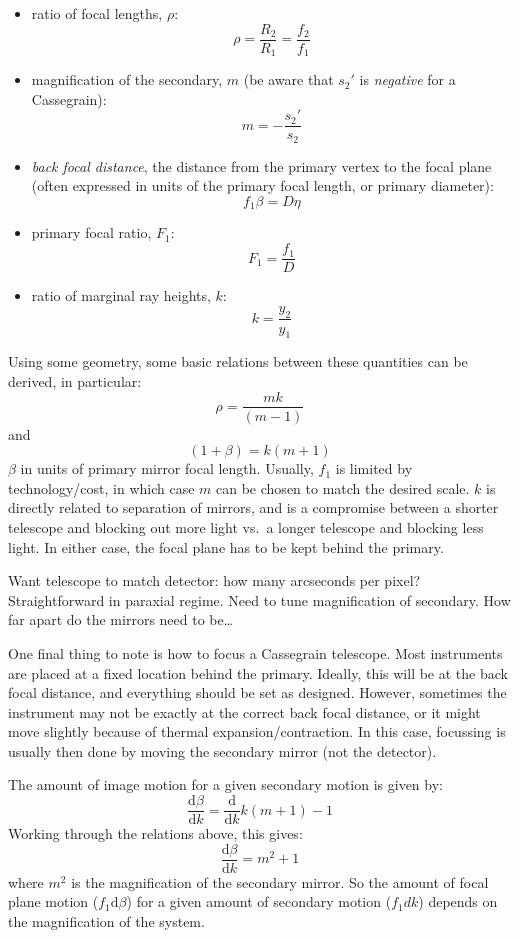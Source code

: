 \documentclass[12pt]{article}
\begin{document}
\begin{itemize}
    \item ratio of focal lengths, $\rho$:
        $$ \rho = \frac{R_2}{R_1} = \frac{f_2}{f_1}  $$
    \item magnification of the secondary, $m$ (be aware that $s_{2}'$ is
        \emph{negative} for a Cassegrain):
        $$ m = -\frac{s_2'}{s_2} $$
    \item \emph{back focal distance},
        the distance from the primary vertex to
        the focal plane (often expressed in units of the primary focal
        length, or primary diameter):
        $$ f_{1}\beta = D\eta  $$
    \item primary focal ratio, $F_{1}$:
        $$ F_{1} = \frac{f_{1}}{D} $$
    \item ratio of marginal ray heights, $k$:
        $$ k = \frac{y_{2}}{y_{1}}  $$
\end{itemize}
Using some geometry, some basic relations between these quantities
can be derived, in particular:{$$
    \rho = \frac{mk}{(m-1)}
$$}and{$$
    (1+\beta) = k(m+1)
$$}$\beta$ in units of primary mirror focal length.
Usually, $f_{1}$ is limited by technology/cost, in which case
$m$ can be chosen to match the
desired scale. $k$ is directly related to separation of mirrors, and is a
compromise between a shorter telescope and blocking out more
light vs.\ a longer telescope and blocking less light.
In either case, the focal plane has to be kept behind the primary.

\textcolor{myBlue}{%
Want telescope to match detector: how many arcseconds per pixel?
Straightforward in paraxial regime. Need to tune magnification of secondary.
How far apart do the mirrors need to be\ldots}

One final thing to note is how to focus a Cassegrain telescope. Most
instruments are placed at a fixed location behind the primary.
Ideally, this will be at the back focal distance, and everything
should be set as designed. However, sometimes the instrument may not
be exactly at the correct back focal distance, or it might move
slightly because of thermal expansion/contraction. In this case,
focussing is usually then done by moving the secondary mirror
(not the detector).

The amount of image motion for a given secondary motion is given by:{$$
    \frac{\textrm{d}\beta}{\textrm{d}k} =
    \frac{\textrm{d}}{\textrm{d}k}k\left(m+1\right)-1
$$}Working through the relations above, this gives:{$$
    \frac{\textrm{d}\beta}{\textrm{d}k} = m^{2}+1
$$}where $m^{2}$ is the magnification of the secondary mirror.
So the amount of focal plane motion ($f_{1}\textrm{d}\beta$)
for a given amount of secondary motion ($f_{1}dk$) depends on the
magnification of the system.
\end{document}
